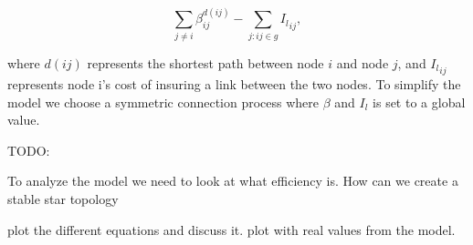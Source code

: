 \begin{equation}
\sum_{j\neq i}^{} \beta_{ij}^{d(ij)} - \sum_{j:ij\in g}^{} {I_{l}}_{ij}, 
\label{connecetionGame}
\end{equation}

where $d(ij)$ represents the shortest path between node $i $ and node $j $, and ${I_{l}}_{ij}$ represents node i's cost of insuring a link between the two nodes. To simplify the model we choose a symmetric connection process where $\beta$ and $I_{l}$ is set to a global value. 



TODO: 

To analyze the model we need to look at what efficiency is. 
How can we create a stable star topology

plot the different equations and discuss it. plot with real values from the model.

